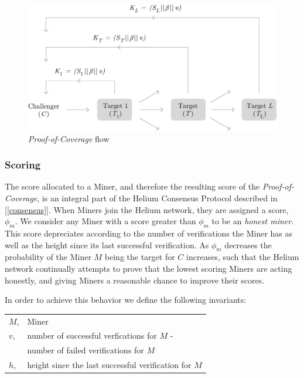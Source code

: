 \documentclass[10pt, nonatbib, nocopyrightspace, reprint]{sigplanconf}
\newcommand{\secref}[1]{[\autoref{#1}]}
\begin{document}
\begin{figure}[ht]
    \begin{center}
          \includegraphics[width=\columnwidth]{o_propagation.eps}
          \caption{\emph{Proof-of-Coverage} flow}\label{fig:poc-propogation}
     \end{center}
\end{figure}

\subsubsection{Scoring}\label{scores}

The score allocated to a Miner, and therefore the resulting score of the \emph{Proof-of-Coverage}, is an integral part of the Helium Consensus Protocol described in \secref{consensus}. When Miners join the Helium network, they are assigned a score, $\phi_m$. We consider any Miner with a score greater than $\phi_m$ to be an \emph{honest miner}. This score depreciates according to the number of verifications the Miner has as well as the height since its last successful verification. As $\phi_m$ decreases the probability of the Miner $M$ being the target for $C$ increases, such that the Helium network continually attempts to prove that the lowest scoring Miners are acting honestly, and giving Miners a reasonable chance to improve their scores.

In order to achieve this behavior we define the following invariants:

\begin{tabular}{l l}
        $M$, & Miner                                         \\
        $v$, &number of successful verfications for $M$ -\\
        & number of failed verifications for $M$ \\
        $h$,          & height since the last successful verification for $M$\\
\end{tabular}
\end{document}
